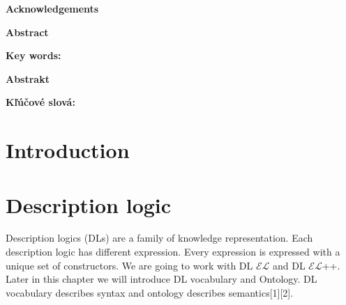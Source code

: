 \documentclass[12pt,a4paper]{article}
\newcommand{\textoverline}[1]{{\setul{-5em}{}$\overline{\mbox{#1}}$}}
\begin{document}
\pagebreak

\justify


\pagebreak
\thispagestyle{empty}
\par\vspace*{15cm}
{\large\bf Acknowledgements \newline \par}

\pagebreak
\thispagestyle{empty}
{\large\bf Abstract \newline \par} 

\textbf{Key words:}

\pagebreak
\thispagestyle{empty}
{\large\bf Abstrakt \newline \par} 

\textbf{Kľúčové slová:}

\pagebreak
\thispagestyle{empty}
\tableofcontents
\thispagestyle{empty}

\pagebreak
\thispagestyle{empty}
\listoffigures

\pagebreak
\section*{Introduction}


\pagebreak
\section{Description logic}
Description logics (DLs) are a family of knowledge representation. Each description logic has different expression. Every expression is expressed with a unique set of constructors. We are going to work with DL $\mathcal{EL}$ and DL $\mathcal{EL}${+}{+}. Later in this chapter we will introduce DL vocabulary and Ontology. DL vocabulary describes syntax and ontology describes semantics[1][2].
\end{document}
